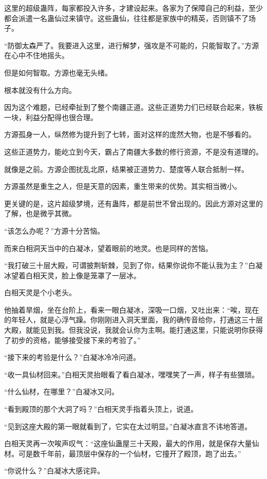 \begin{this_body}
这里的超级蛊阵，每家都投入许多，才建设起来。各家为了保障自己的利益，至少都会派遣一名蛊仙过来镇守。这些蛊仙，往往都是家族中的精英，否则镇不了场子。

“防御太森严了。我要进入这里，进行解梦，强攻是不可能的，只能智取了。”方源在心中不住地摇头。

但是如何智取。方源也毫无头绪。

根本就没有什么方向。

因为这个难题，已经牵扯到了整个南疆正道。这些正道势力们已经联合起来，铁板一块，利益分配得也很合理。

方源孤身一人，纵然修为提升到了七转，面对这样的庞然大物，也是不够看的。

这些正道势力，能屹立到今天，霸占了南疆大多数的修行资源，不是没有道理的。

就像是之前。方源企图扰乱北原，结果被正道势力、楚度等人联合抵制一样。

方源虽然是重生之人，但是天意的因素，重生带来的优势。其实相当微小。

更关键的是，这片超级梦境，还有蛊阵，都是前世不曾出现的。因此方源对这里的了解，也是微乎其微。

“该怎么办呢？”方源十分苦恼。

而来白相洞天当中的白凝冰，望着眼前的地灵。也是同样的苦恼。

“我打破三十层大殿，可谓披荆斩棘，见到了你，结果你说你不能认我为主？”白凝冰望着白相天灵，脸上像是笼罩了一层冰。

白相天灵是个小老头。

他抽着旱烟，坐在台阶上，看来一眼白凝冰，深吸一口烟，又吐出来：“唉，现在的年轻人，就是心浮气躁。你刚刚进入洞天里面，我的确传音给你，打通这三十层大殿，就能见到我。但我没说，我就会认你为主啊。能打通这里，只能说明你获得了初步的资格，能够接受接下来的考验了。”

“接下来的考验是什么？”白凝冰冷冷问道。

“收一具仙材回来。”白相天灵抬眼看了看白凝冰，嘿嘿笑了一声，样子有些猥琐。

“什么仙材，在哪里？”白凝冰又问。

“看到殿顶的那个大洞了吗？”白相天灵手指着头顶上，说道。

“见到这座大殿的第一眼就看到了，它实在太过明显。”白凝冰直言不讳地答道。

白相天灵再一次唉声叹气：“这座仙蛊屋三十天殿，最大的作用，就是保存大量仙材。可是数千年前，最顶层中保存的一个仙材，它撞开了殿顶，跑了出去。”

“你说什么？”白凝冰大感诧异。


\end{this_body}
